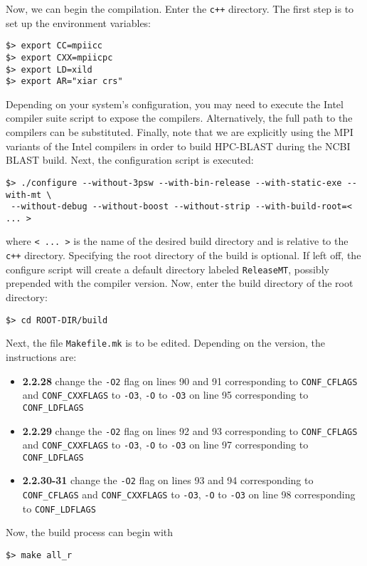 \documentclass[10pt]{article}
\begin{document}
\noindent Now, we can begin the compilation.  Enter the  \verb^c++^ directory.  The first step is to set up the environment variables:
\begin{verbatim}
$> export CC=mpiicc
$> export CXX=mpiicpc
$> export LD=xild
$> export AR="xiar crs" 
\end{verbatim}
\noindent Depending on your system's configuration, you may need to execute the Intel compiler suite script to expose the compilers.  Alternatively, the full path to the compilers can be substituted.  Finally, note that we are explicitly using the MPI variants
of the Intel compilers in order to build HPC-BLAST during the NCBI BLAST build.  Next, the configuration script is executed:
\begin{verbatim}
$> ./configure --without-3psw --with-bin-release --with-static-exe --with-mt \
 --without-debug --without-boost --without-strip --with-build-root=< ... >
\end{verbatim}
\noindent where \verb^< ... >^ is the name of the desired build directory and is relative to the \verb^c++^ directory.  Specifying the root directory of the build is optional.  If left off, the configure script will create a default directory labeled \verb^ReleaseMT^, possibly
prepended with the compiler version.  Now, enter the build directory of the root directory:
\begin{verbatim}
$> cd ROOT-DIR/build
\end{verbatim}
\noindent Next, the file \verb^Makefile.mk^ is to be edited. Depending on the version, the instructions are:
\begin{itemize}
\item {\bf 2.2.28} change the \verb^-O2^ flag on lines 90 and 91 corresponding to \verb^CONF_CFLAGS^ and \verb^CONF_CXXFLAGS^ to \verb^-O3^, \verb^-O^ to \verb^-O3^ on line 95 corresponding
to \verb^CONF_LDFLAGS^
\item {\bf 2.2.29} change the \verb^-O2^ flag on lines 92 and 93 corresponding to \verb^CONF_CFLAGS^ and \verb^CONF_CXXFLAGS^ to \verb^-O3^, \verb^-O^ to \verb^-O3^ on line 97 corresponding
to \verb^CONF_LDFLAGS^
\item {\bf 2.2.30-31} change the \verb^-O2^ flag on lines 93 and 94 corresponding to \verb^CONF_CFLAGS^ and \verb^CONF_CXXFLAGS^ to \verb^-O3^, \verb^-O^ to \verb^-O3^ on line 98 corresponding
to \verb^CONF_LDFLAGS^
\end{itemize}
\noindent Now, the build process can begin with
\begin{verbatim}
$> make all_r
\end{verbatim}
\end{document}
